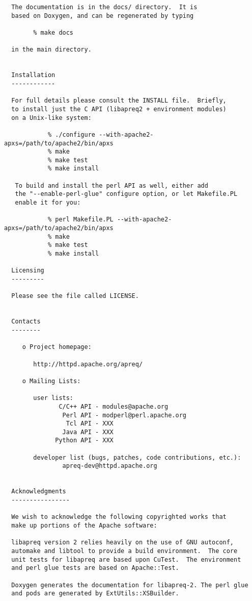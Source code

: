\begin{verbatim}
  The documentation is in the docs/ directory.  It is
  based on Doxygen, and can be regenerated by typing

        % make docs

  in the main directory.


  Installation
  ------------

  For full details please consult the INSTALL file.  Briefly,
  to install just the C API (libapreq2 + environment modules)
  on a Unix-like system:

            % ./configure --with-apache2-apxs=/path/to/apache2/bin/apxs
            % make
            % make test
            % make install

   To build and install the perl API as well, either add
   the "--enable-perl-glue" configure option, or let Makefile.PL
   enable it for you:

            % perl Makefile.PL --with-apache2-apxs=/path/to/apache2/bin/apxs
            % make
            % make test 
            % make install

  Licensing
  ---------

  Please see the file called LICENSE.


  Contacts
  --------

     o Project homepage:

        http://httpd.apache.org/apreq/

     o Mailing Lists:

        user lists:
               C/C++ API - modules@apache.org
                Perl API - modperl@perl.apache.org
                 Tcl API - XXX
                Java API - XXX
              Python API - XXX

        developer list (bugs, patches, code contributions, etc.):
                apreq-dev@httpd.apache.org


  Acknowledgments
  ----------------

  We wish to acknowledge the following copyrighted works that
  make up portions of the Apache software:

  libapreq version 2 relies heavily on the use of GNU autoconf, 
  automake and libtool to provide a build environment.  The core
  unit tests for libapreq are based upon CuTest.  The environment
  and perl glue tests are based on Apache::Test.  

  Doxygen generates the documentation for libapreq-2. The perl glue
  and pods are generated by ExtUtils::XSBuilder.

\end{verbatim}\normalsize 


